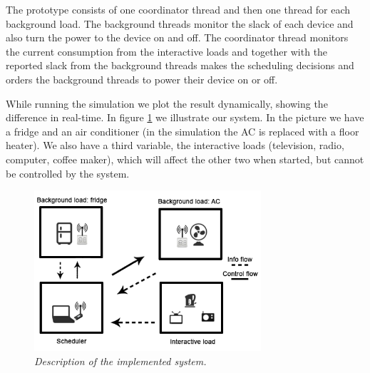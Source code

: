 The prototype consists of one coordinator thread and then one thread for each background load. The background threads monitor the slack of each device and also turn the power to the device on and off. The coordinator thread monitors the current consumption from the interactive loads and together with the reported slack from the background threads makes the scheduling decisions and orders the background threads to power their device on or off.

While running the simulation we plot the result dynamically, showing the difference in real-time. In figure \ref{runView} we illustrate our system. In the picture we have a fridge and an air conditioner (in the simulation the AC is replaced with a floor heater). We also have a third variable, the interactive loads (television, radio, computer, coffee maker), which will affect the other two when started, but cannot be controlled by the system.

\begin{figure}[!ht]
\centering
\includegraphics[width=0.75\textwidth]{img/dat300_final_desc.png}
\caption[Project Description]{\emph{\small Description of the implemented system.}}
\label{runView}
\end{figure}

